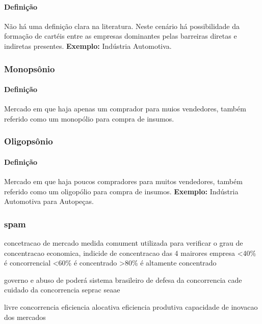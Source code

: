 \documentclass{article}
\begin{document}
            \paragraph{Definição}Não há uma definição clara na literatura. Neste cenário há possibilidade da formação de cartéis entre as empresas dominantes pelas barreiras diretas e indiretas presentes. \textbf{Exemplo:} Indústria Automotiva.

        \subsubsection{Monopsônio}
            \paragraph{Definição}Mercado em que haja apenas um comprador para muios vendedores, também referido como um monopólio para compra de insumos.

        \subsubsection{Oligopsônio}
            \paragraph{Definição}Mercado em que haja poucos compradores para muitos vendedores, também referido como um oligopólio para compra de insumos. \textbf{Exemplo:} Indústria Automotiva para Autopeças.

        \subsubsection{spam}

            concetracao de mercado
                medida comument utilizada para verificar o grau de concentracao economica, indicide de concentracao das 4 mairores empresa 
                    <40\% é concorrencial
                    <60\% é concentrado
                    >80\% é altamente concentrado

            governo e abuso de poderá
                sistema brasileiro de defesa da concorrencia
                    cade
                        cuidado da concorrencia
                    seprac
                    seaae

            livre concorrencia
                eficiencia alocativa
                eficiencia produtiva
                capacidade de inovacao dos mercados
\end{document}

